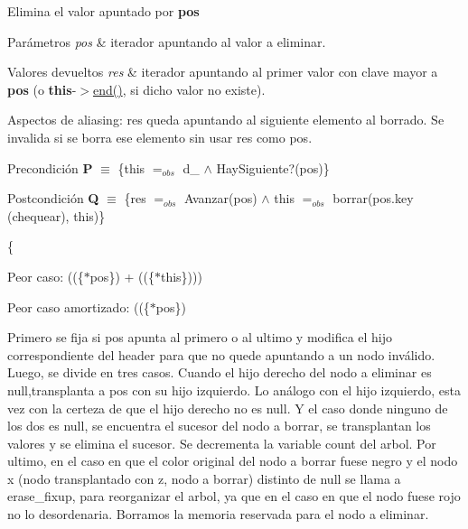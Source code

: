 Elimina el valor apuntado por {\bfseries pos} 


\begin{DoxyParams}{Parámetros}
{\em pos} & iterador apuntando al valor a eliminar. \\
\hline
\end{DoxyParams}

\begin{DoxyRetVals}{Valores devueltos}
{\em res} & iterador apuntando al primer valor con clave mayor a {\bfseries pos} (o {\bfseries this}-\/$>$\hyperlink{classaed2_1_1map_a76023e6a56cb625513e1b5ea028bf983_a76023e6a56cb625513e1b5ea028bf983}{end()}, si dicho valor no existe).\\
\hline
\end{DoxyRetVals}
\begin{DoxyParagraph}{Aspectos de aliasing\+:}
res queda apuntando al siguiente elemento al borrado. Se invalida si se borra ese elemento sin usar res como pos.
\end{DoxyParagraph}
\begin{DoxyPrecond}{Precondición}
{\bfseries P} $\equiv$ \{this $=_{obs}$ d\+\_ $\land$ Hay\+Siguiente?(pos)\} 
\end{DoxyPrecond}
\begin{DoxyPostcond}{Postcondición}
{\bfseries Q} $\equiv$ \{res $=_{obs}$ Avanzar(pos) $\land$ this $=_{obs}$ borrar(pos.\+key (chequear), this)\}
\end{DoxyPostcond}
\{
\begin{DoxyItemize}
\item Peor caso\+: ((\{$\ast$pos\}) + ((\{$\ast$this\})))
\item Peor caso amortizado\+: ((\{$\ast$pos\})
\end{DoxyItemize}

Primero se fija si pos apunta al primero o al ultimo y modifica el hijo correspondiente del header para que no quede apuntando a un nodo inválido. Luego, se divide en tres casos. Cuando el hijo derecho del nodo a eliminar es null,transplanta a pos con su hijo izquierdo. Lo análogo con el hijo izquierdo, esta vez con la certeza de que el hijo derecho no es null. Y el caso donde ninguno de los dos es null, se encuentra el sucesor del nodo a borrar, se transplantan los valores y se elimina el sucesor. Se decrementa la variable count del arbol. Por ultimo, en el caso en que el color original del nodo a borrar fuese negro y el nodo x (nodo transplantado con z, nodo a borrar) distinto de null se llama a erase\+\_\+fixup, para reorganizar el arbol, ya que en el caso en que el nodo fuese rojo no lo desordenaria. Borramos la memoria reservada para el nodo a eliminar. 

